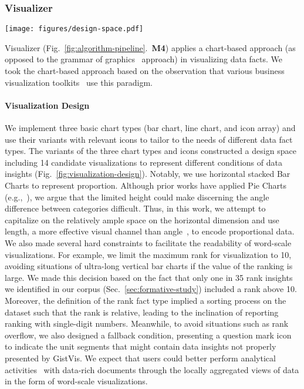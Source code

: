 \subsubsection{Visualizer}

\begin{figure*}[tb]
  \centering
  \texttt{[image: figures/design-space.pdf]}
  \caption{A collection of 14 candidate visualizations and the corresponding chart type for each data fact type. The \textbf{Example} column shows the effect of the appearance of word-scale visualization in data-rich documents. We present the examples when the mouse hovers over the word-scale visualization of focus.}
  \label{fig:visualization-design}
\end{figure*}

Visualizer (Fig.~\ref{fig:algorithm-pipeline}.~\textbf{M4}) applies a chart-based approach (as opposed to the grammar of graphics~\cite{wilkinson2012grammar} approach) in visualizing data facts. We took the chart-based approach based on the observation that various business visualization toolkits~\cite{g2plot-2024, echarts-2024} use this paradigm. 

\paragraph{Visualization Design}
We implement three basic chart types (bar chart, line chart, and icon array) and use their variants with relevant icons to tailor to the needs of different data fact types. The variants of the three chart types and icons constructed a design space including 14 candidate visualizations to represent different conditions of data insights (Fig.~\ref{fig:visualization-design}). Notably, we use horizontal stacked Bar Charts to represent proportion. Although prior works have applied Pie Charts (e.g.,~\cite{goffin2017Exploratory, huth2024eye}), we argue that the limited height could make discerning the angle difference between categories difficult. Thus, in this work, we attempt to capitalize on the relatively ample space on the horizontal dimension and use length, a more effective visual channel than angle~\cite{munzner2014visualization}, to encode proportional data. We also made several hard constraints to facilitate the readability of word-scale visualizations. For example, we limit the maximum rank for visualization to 10, avoiding situations of ultra-long vertical bar charts if the value of the ranking is large. We made this decision based on the fact that only one in 35 rank insights we identified in our corpus (Sec.~\ref{sec:formative-study}) included a rank above 10. Moreover, the definition of the rank fact type implied a sorting process on the dataset such that the rank is relative, leading to the inclination of reporting ranking with single-digit numbers. Meanwhile, to avoid situations such as rank overflow, we also designed a fallback condition, presenting a question mark icon to indicate the unit segments that might contain data insights not properly presented by GistVis. We expect that users could better perform analytical activities~\cite{amar2005lowlevel} with data-rich documents through the locally aggregated views of data in the form of word-scale visualizations.

